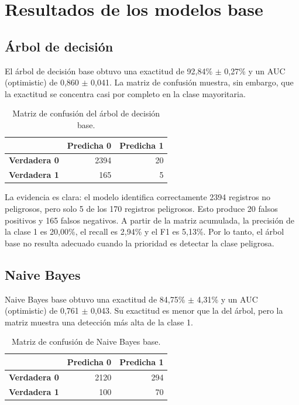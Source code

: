\documentclass[12pt,a4paper]{article}
\begin{document}
\section{Resultados de los modelos base}
\subsection{Árbol de decisión}
El árbol de decisión base obtuvo una exactitud de 92,84\% $\pm$ 0,27\% y un AUC (optimistic) de 0,860 $\pm$ 0,041. La matriz de confusión muestra, sin embargo, que la exactitud se concentra casi por completo en la clase mayoritaria.

\begin{table}[H]
\centering
\caption{Matriz de confusión del árbol de decisión base.}
\label{tab:dt-base-matrix}
\begin{tabular}{lrr}
\toprule
& \textbf{Predicha 0} & \textbf{Predicha 1} \\
\midrule
\textbf{Verdadera 0} & 2394 & 20 \\
\textbf{Verdadera 1} & 165 & 5 \\
\bottomrule
\end{tabular}
\end{table}

La evidencia es clara: el modelo identifica correctamente 2394 registros no peligrosos, pero solo 5 de los 170 registros peligrosos. Esto produce 20 falsos positivos y 165 falsos negativos. A partir de la matriz acumulada, la precisión de la clase 1 es 20,00\%, el recall es 2,94\% y el F1 es 5,13\%. Por lo tanto, el árbol base no resulta adecuado cuando la prioridad es detectar la clase peligrosa.

\subsection{Naive Bayes}
Naive Bayes base obtuvo una exactitud de 84,75\% $\pm$ 4,31\% y un AUC (optimistic) de 0,761 $\pm$ 0,043. Su exactitud es menor que la del árbol, pero la matriz muestra una detección más alta de la clase 1.

\begin{table}[H]
\centering
\caption{Matriz de confusión de Naive Bayes base.}
\label{tab:nb-base-matrix}
\begin{tabular}{lrr}
\toprule
& \textbf{Predicha 0} & \textbf{Predicha 1} \\
\midrule
\textbf{Verdadera 0} & 2120 & 294 \\
\textbf{Verdadera 1} & 100 & 70 \\
\bottomrule
\end{tabular}
\end{table}
\end{document}
